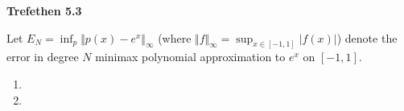 \textbf{Trefethen 5.3}

Let $E_N = \inf_p \Vert p(x) - e^x \Vert_{\infty}$ (where 
$\Vert f \Vert_{\infty} = \sup_{x \in [-1, 1]} \vert f(x) \vert$) denote the error in degree $N$ minimax polynomial 
approximation to $e^x$ on $[-1, 1]$.

\begin{enumerate}
  \item 
  \pagebreak
  \item 
\end{enumerate}